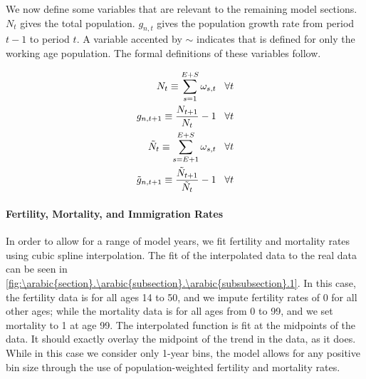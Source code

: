 \documentclass[10pt]{article}
\renewcommand{\thesection}{\arabic{section}}
\renewcommand{\thesubsection}{\thesection.\arabic{subsection}}
\renewcommand{\thesubsubsection}{\thesubsection.\arabic{subsubsection}}
\numberwithin{equation}{subsection}
\begin{document}
\begin{appendices}
\par We now define some variables that are relevant to the remaining model sections. \(N_t\) gives the total population. \(g_{n,t}\) gives the population growth rate from period \(t-1\) to period \(t\). A variable accented by \(\sim\) indicates that is defined for only the working age population. The formal definitions of these variables follow.

\begin{align}
   N_t \equiv \sum_{s=1}^{E+S}\omega_{s,t} \hspace{3mm} \forall t \\
   g_{n,t+1} \equiv \frac{N_{t+1}}{N_t} - 1 \hspace{3mm} \forall t \\
   \tilde{N}_t \equiv \sum_{s=E+1}^{E+S}\omega_{s,t} \hspace{3mm} \forall t \\
   \tilde{g}_{n,t+1} \equiv \frac{\tilde{N}_{t+1}}{\tilde{N}_t} - 1 \hspace{3mm} \forall t
\end{align}


\paragraph{Fertility, Mortality, and Immigration Rates}

\par In order to allow for a range of model years, we fit fertility and mortality rates using cubic spline interpolation. The fit of the interpolated data to the real data can be seen in \autoref{fig:\thesubsubsection.1}. In this case, the fertility data is for all ages 14 to 50, and we impute fertility rates of 0 for all other ages; while the mortality data is for all ages from 0 to 99, and we set mortality to 1 at age 99. The interpolated function is fit at the midpoints of the data. It should exactly overlay the midpoint of the trend in the data, as it does. While in this case we consider only 1-year bins, the model allows for any positive bin size through the use of population-weighted fertility and mortality rates.


\end{appendices}
\end{document}
